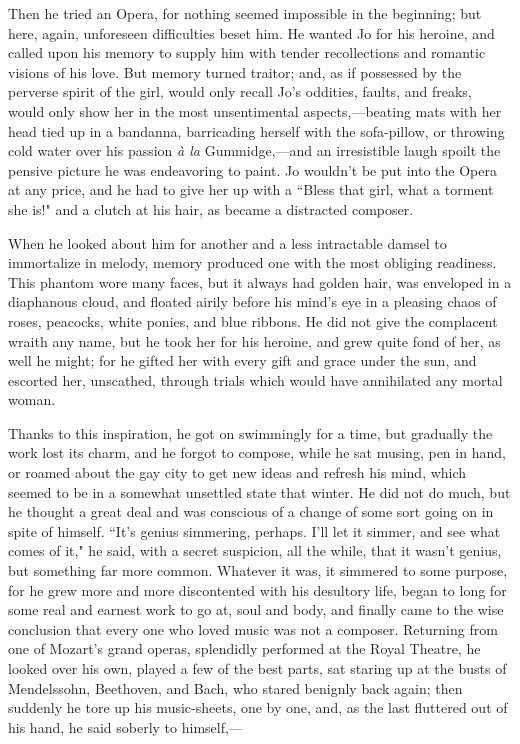 Then he tried an Opera, for nothing seemed impossible in the beginning;
but here, again, unforeseen difficulties beset him. He wanted Jo for his
heroine, and called upon his memory to supply him with tender
recollections and romantic visions of his love. But memory turned
traitor; and, as if possessed by the perverse spirit of the girl, would
only recall Jo's oddities, faults, and freaks, would
only show her in the most unsentimental aspects,---beating mats with her
head tied up in a bandanna, barricading herself with the sofa-pillow, or
throwing cold water over his passion \emph{à la} Gummidge,---and an
irresistible laugh spoilt the pensive picture he was endeavoring to
paint. Jo wouldn't be put into the Opera at any price,
and he had to give her up with a ``Bless that girl, what a torment she
is!" and a clutch at his hair, as became a distracted composer.

When he looked about him for another and a less intractable damsel to
immortalize in melody, memory produced one with the most obliging
readiness. This phantom wore many faces, but it always had golden hair,
was enveloped in a diaphanous cloud, and floated airily before his
mind's eye in a pleasing chaos of roses, peacocks, white
ponies, and blue ribbons. He did not give the complacent wraith any
name, but he took her for his heroine, and grew quite fond of her, as
well he might; for he gifted her with every gift and grace under the
sun, and escorted her, unscathed, through trials which would have
annihilated any mortal woman.

Thanks to this inspiration, he got on swimmingly for a time, but
gradually the work lost its charm, and he forgot to compose, while he
sat musing, pen in hand, or roamed about the gay city to get new ideas
and refresh his mind, which seemed to be in a somewhat unsettled state
that winter. He did not do much, but he thought a great deal and was
conscious of a change of some sort going on in spite of himself.
``It's genius simmering, perhaps. I'll
let it simmer, and see what comes of it," he said, with a secret
suspicion, all the while, that it wasn't genius, but
something far more common. Whatever it was, it simmered to some purpose,
for he grew more and more discontented with his desultory life, began to
long for some real and earnest work to go at, soul and body, and finally
came to the wise conclusion that every one who loved music was not a
composer. Returning from one of Mozart's grand operas,
splendidly performed at the Royal Theatre, he looked over his own,
played a few of the best parts, sat staring up at the busts of
Mendelssohn, Beethoven, and Bach, who stared benignly back again; then
suddenly he tore up his music-sheets, one by one, and, as the last
fluttered out of his hand, he said soberly to himself,---

